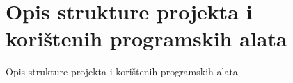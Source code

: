\chapter{Opis strukture projekta i korištenih programskih alata}
\label{ch:opis-strukture-projekta-i-koristenih-programskih-alata}
Opis strukture projekta i korištenih programskih alata %

